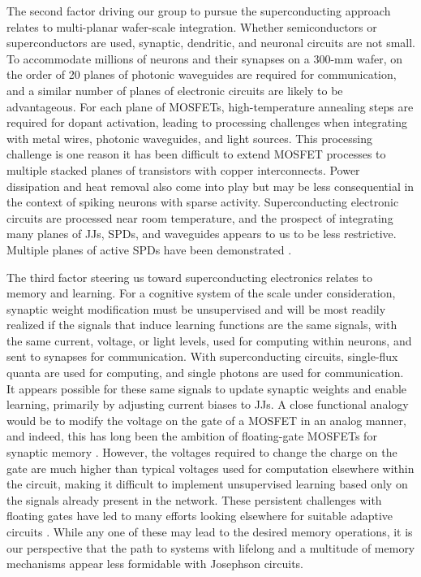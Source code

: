 \documentclass[twocolumn]{article}
\begin{document}
The second factor driving our group to pursue the superconducting approach relates to multi-planar wafer-scale integration. Whether semiconductors or superconductors are used, synaptic, dendritic, and neuronal circuits are not small. To accommodate millions of neurons and their synapses on a 300-mm wafer, on the order of 20 planes of photonic waveguides are required for communication, and a similar number of planes of electronic circuits are likely to be advantageous. For each plane of MOSFETs, high-temperature annealing steps are required for dopant activation, leading to processing challenges when integrating with metal wires, photonic waveguides, and light sources. This processing challenge is one reason it has been difficult to extend MOSFET processes to multiple stacked planes of transistors with copper interconnects. Power dissipation and heat removal also come into play but may be less consequential in the context of spiking neurons with sparse activity. Superconducting electronic circuits are processed near room temperature, and the prospect of integrating many planes of JJs, SPDs, and waveguides appears to us to be less restrictive. Multiple planes of active SPDs have been demonstrated \cite{vema2012}.

The third factor steering us toward superconducting electronics relates to memory and learning. For a cognitive system of the scale under consideration, synaptic weight modification must be unsupervised and will be most readily realized if the signals that induce learning functions are the same signals, with the same current, voltage, or light levels, used for computing within neurons, and sent to synapses for communication. With superconducting circuits, single-flux quanta are used for computing, and single photons are used for communication. It appears possible for these same signals to update synaptic weights and enable learning, primarily by adjusting current biases to JJs. A close functional analogy would be to modify the voltage on the gate of a MOSFET in an analog manner, and indeed, this has long been the ambition of floating-gate MOSFETs for synaptic memory \cite{hama2013}. However, the voltages required to change the charge on the gate are much higher than typical voltages used for computation elsewhere within the circuit, making it difficult to implement unsupervised learning based only on the signals already present in the network. These persistent challenges with floating gates have led to many efforts looking elsewhere for suitable adaptive circuits \cite{upji2019}. While any one of these may lead to the desired memory operations, it is our perspective that the path to systems with lifelong and a multitude of memory mechanisms appear less formidable with Josephson circuits.
\end{document}
